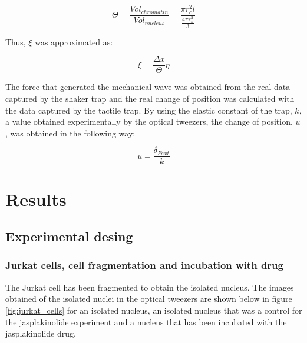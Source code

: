 \documentclass[12pt, a4paper]{article} %
\begin{document}
\begin{equation} \label{eqn:frac_nucl_chro}
	\Theta = \frac{Vol_{chromatin}}{Vol_{nucleus}} = \frac{\pi r_{c}^{2} l}{\frac{4\pi r_{n}^{3}}{3}}
\end{equation}

Thus, $\xi$ was approximated as:

\begin{equation} \label{eqn:frac_nucl_chro}
	\xi = \frac{\Delta x}{\Theta} \eta
\end{equation}

The force that generated the mechanical wave was obtained from the real data captured by the shaker trap and the real change of position was calculated with the data captured by the tactile trap. By using the elastic constant of the trap, $k$, a value obtained experimentally by the optical tweezers, the change of position, $u$, was obtained in the following way:

\begin{equation} \label{eqn:real_desp}
	u = \frac{\delta_{Fext}}{k}
\end{equation}

\newpage


\section{Results}

\setlength{\parskip}{0mm}

\subsection{Experimental desing}

\subsubsection{Jurkat cells, cell fragmentation and incubation with drug}

The Jurkat cell has been fragmented to obtain the isolated nucleus. The images obtained of the isolated nuclei in the optical tweezers are shown below in figure \ref{fig:jurkat_cells} for an isolated nucleus, an isolated nucleus that was a control for the jasplakinolide experiment and a nucleus that has been incubated with the jasplakinolide drug.
\end{document}
